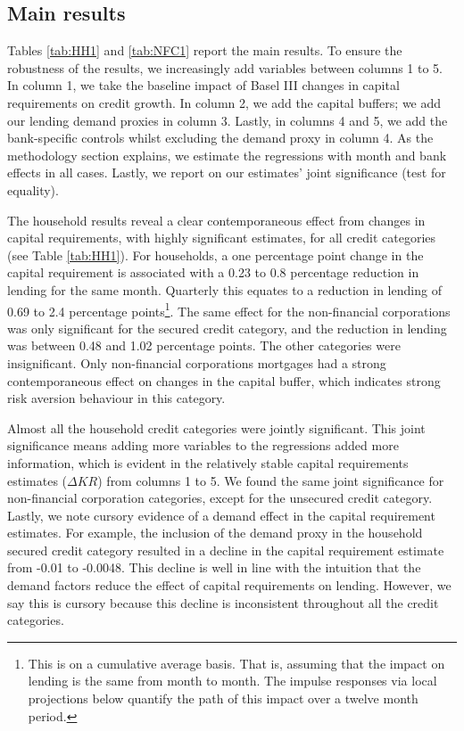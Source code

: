 \documentclass[
  12,
]{article}
\begin{document}
\hypertarget{main-results}{%
\subsection{Main results}\label{main-results}}

Tables \ref{tab:HH1} and \ref{tab:NFC1} report the main results. To ensure the robustness of the results, we increasingly add variables between columns 1 to 5. In column 1, we take the baseline impact of Basel III changes in capital requirements on credit growth. In column 2, we add the capital buffers; we add our lending demand proxies in column 3. Lastly, in columns 4 and 5, we add the bank-specific controls whilst excluding the demand proxy in column 4. As the methodology section explains, we estimate the regressions with month and bank effects in all cases. Lastly, we report on our estimates' joint significance (test for equality).

The household results reveal a clear contemporaneous effect from changes in capital requirements, with highly significant estimates, for all credit categories (see Table \ref{tab:HH1}). For households, a one percentage point change in the capital requirement is associated with a 0.23 to 0.8 percentage reduction in lending for the same month. Quarterly this equates to a reduction in lending of 0.69 to 2.4 percentage points\footnote{This is on a cumulative average basis. That is, assuming that the impact on lending is the same from month to month. The impulse responses via local projections below quantify the path of this impact over a twelve month period.}. The same effect for the non-financial corporations was only significant for the secured credit category, and the reduction in lending was between 0.48 and 1.02 percentage points. The other categories were insignificant. Only non-financial corporations mortgages had a strong contemporaneous effect on changes in the capital buffer, which indicates strong risk aversion behaviour in this category.

Almost all the household credit categories were jointly significant. This joint significance means adding more variables to the regressions added more information, which is evident in the relatively stable capital requirements estimates (\(\Delta KR\)) from columns 1 to 5. We found the same joint significance for non-financial corporation categories, except for the unsecured credit category. Lastly, we note cursory evidence of a demand effect in the capital requirement estimates. For example, the inclusion of the demand proxy in the household secured credit category resulted in a decline in the capital requirement estimate from -0.01 to -0.0048. This decline is well in line with the intuition that the demand factors reduce the effect of capital requirements on lending. However, we say this is cursory because this decline is inconsistent throughout all the credit categories.
\newpage
\end{document}
